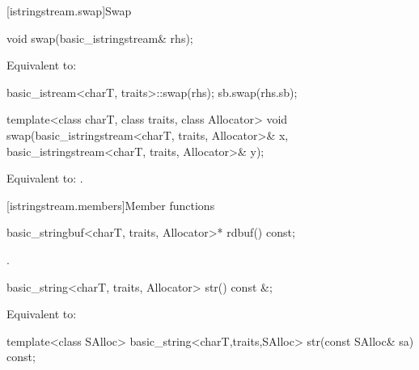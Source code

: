 [istringstream.swap]{Swap}

%
\begin{itemdecl}
void swap(basic_istringstream& rhs);
\end{itemdecl}

\begin{itemdescr}
\pnum
\effects
Equivalent to:
\begin{codeblock}
basic_istream<charT, traits>::swap(rhs);
sb.swap(rhs.sb);
\end{codeblock}
\end{itemdescr}


%
\begin{itemdecl}
template<class charT, class traits, class Allocator>
  void swap(basic_istringstream<charT, traits, Allocator>& x,
            basic_istringstream<charT, traits, Allocator>& y);
\end{itemdecl}

\begin{itemdescr}
\pnum
\effects
Equivalent to: .
\end{itemdescr}

[istringstream.members]{Member functions}

%
\begin{itemdecl}
basic_stringbuf<charT, traits, Allocator>* rdbuf() const;
\end{itemdecl}

\begin{itemdescr}
\pnum
\returns
{}.
\end{itemdescr}

%
\begin{itemdecl}
basic_string<charT, traits, Allocator> str() const &;
\end{itemdecl}

\begin{itemdescr}
\pnum
\effects
Equivalent to: 
\end{itemdescr}

%
\begin{itemdecl}
template<class SAlloc>
  basic_string<charT,traits,SAlloc> str(const SAlloc& sa) const;
\end{itemdecl}


